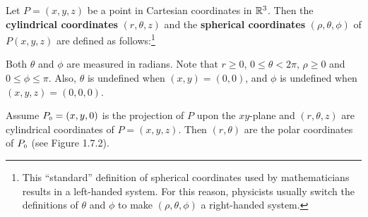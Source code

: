 Let $P = (x,y,z)$ be
a point in Cartesian coordinates in $\mathbb{R}^{3}$.
Then the
\textbf{cylindrical coordinates} $(r,\theta,z)$  and the \textbf{spherical coordinates} $ (\rho,\theta,\phi)$ of
$P(x,y,z)$ are defined as follows:\footnote{This ``standard'' definition of
spherical coordinates used by mathematicians results in a
left-handed system. 
For this reason, physicists usually switch the definitions
of $\theta$ and $\phi$ to make $(\rho,\theta,\phi)$ a right-handed system.}\smallskip


\bigskip
{}
\smallskip

\par Both $\theta$ and $\phi$ are measured in radians.
Note that $r \ge 0$, $0 \le \theta < 2\pi$, $\rho \ge 0$ and $0 \le \phi \le \pi$.
Also, $\theta$ is undefined when $(x,y) = (0,0)$, and $\phi$ is undefined when $(x,y,z) = (0,0,0)$.

Assume $P_{\scriptscriptstyle 0} = (x,y,0)$ is the projection of $P$ upon the
$xy$-plane and $(r,\theta,z)$ are cylindrical coordinates of $P=(x,y,z)$.
Then $(r,\theta)$ are the polar coordinates of $P_{\scriptscriptstyle 0}$ (see
Figure 1.7.2).

